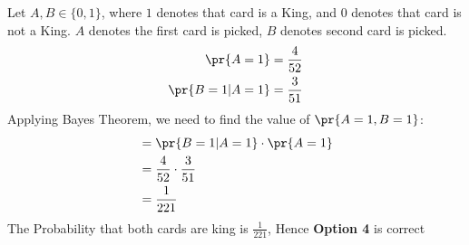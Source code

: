 
Let $A,B \in \{0,1\}$, where $1$ denotes that card is a King, and $0$ denotes that card is not a King. $A$ denotes the first card is picked, $B$ denotes second card is picked.
\begin{align}
    \pr{A=1} &= \frac{4}{52}\\
    \pr{B=1|A=1} &=\frac{3}{51}
\end{align}
Applying Bayes Theorem, we need to find the value of $\pr{A=1,B=1}$:
\begin{align}
    &= \pr{B=1|A=1}\cdot \pr{A=1}\\
    &=\frac{4}{52} \cdot \frac{3}{51}\\
    &= \frac{1}{221}
\end{align}
The Probability that both cards are king is $\frac{1}{221}$, Hence \textbf{Option 4 }is correct
